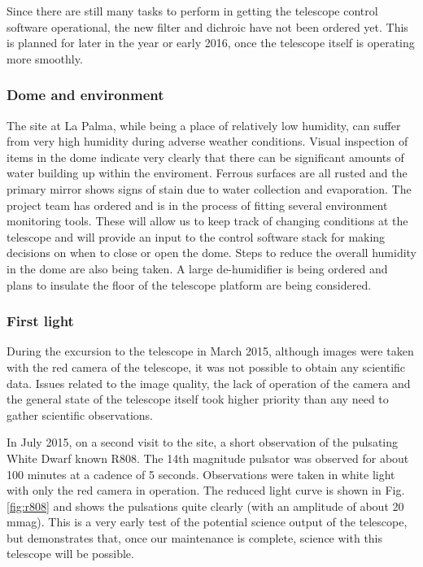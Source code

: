 \documentclass[a4paper,fleqn,usenatbib]{mnras}
\begin{document}
Since there are still many tasks to perform in getting the telescope control software operational, the new filter and dichroic have not been ordered yet. This is planned for later in the year or early 2016, once the telescope itself is operating more smoothly.

\subsubsection{Dome and environment}
The site at La Palma, while being a place of relatively low humidity, can suffer from very high humidity during adverse weather conditions. Visual inspection of items in the dome indicate very clearly that there can be significant amounts of water building up within the enviroment. Ferrous surfaces are all rusted and the primary mirror shows signs of stain due to water collection and evaporation. The project team has ordered and is in the process of fitting several environment monitoring tools. These will allow us to keep track of changing conditions at the telescope and will provide an input to the control software stack for making decisions on when to close or open the dome. Steps to reduce the overall humidity in the dome are also being taken. A large de-humidifier is being ordered and plans to insulate the floor of the telescope platform are being considered.  

\subsubsection{First light}
During the excursion to the telescope in March 2015, although images were taken with the red camera of the telescope, it was not possible to obtain any scientific data. Issues related to the image quality, the lack of operation of the camera and the general state of the telescope itself took higher priority than any need to gather scientific observations. 

In July 2015, on a second visit to the site, a short observation of the pulsating White Dwarf known R808. The 14th magnitude pulsator was observed for about 100 minutes at a cadence of 5 seconds. Observations were taken in white light with only the red camera in operation.  The reduced light curve is shown in Fig. \ref{fig:r808} and shows the pulsations quite clearly (with an amplitude of about 20 mmag). This is a very early test of the potential science output of the telescope, but demonstrates that, once our maintenance is complete, science with this telescope will be possible.
\end{document}
